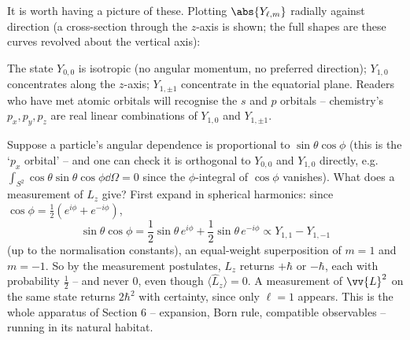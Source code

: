 It is worth having a picture of these. Plotting $\abs{Y_{\ell,m}}$ radially against direction (a cross-section through the $z$-axis is shown; the full shapes are these curves revolved about the vertical axis):

\begin{center}
\end{center}

The state $Y_{0,0}$ is isotropic (no angular momentum, no preferred direction); $Y_{1,0}$ concentrates along the $z$-axis; $Y_{1,\pm1}$ concentrate in the equatorial plane. Readers who have met atomic orbitals will recognise the $s$ and $p$ orbitals -- chemistry's $p_x, p_y, p_z$ are real linear combinations of $Y_{1,0}$ and $Y_{1, \pm 1}$.

\begin{example}[Measuring $L_z$]
    Suppose a particle's angular dependence is proportional to $\sin\theta\cos\phi$ (this is the `$p_x$ orbital' -- and one can check it is orthogonal to $Y_{0,0}$ and $Y_{1,0}$ directly, e.g.\ $\int_{S^2} \cos\theta \sin\theta\cos\phi \dd \Omega = 0$ since the $\phi$-integral of $\cos\phi$ vanishes). What does a measurement of $L_z$ give? First expand in spherical harmonics: since $\cos \phi = \frac{1}{2}(e^{i\phi} + e^{-i\phi})$,
    $$
    \sin\theta\cos\phi = \frac{1}{2}\sin\theta \, e^{i \phi} + \frac{1}{2} \sin \theta \, e^{-i\phi} \propto Y_{1,1} - Y_{1,-1}
    $$
    (up to the normalisation constants), an equal-weight superposition of $m = 1$ and $m = -1$. So by the measurement postulates, $L_z$ returns $+\hbar$ or $-\hbar$, each with probability $\frac{1}{2}$ -- and never $0$, even though $\langle \hat{L}_z \rangle = 0$. A measurement of $\vv{L}^2$ on the same state returns $2\hbar^2$ with certainty, since only $\ell = 1$ appears. This is the whole apparatus of Section 6 -- expansion, Born rule, compatible observables -- running in its natural habitat.
\end{example}

